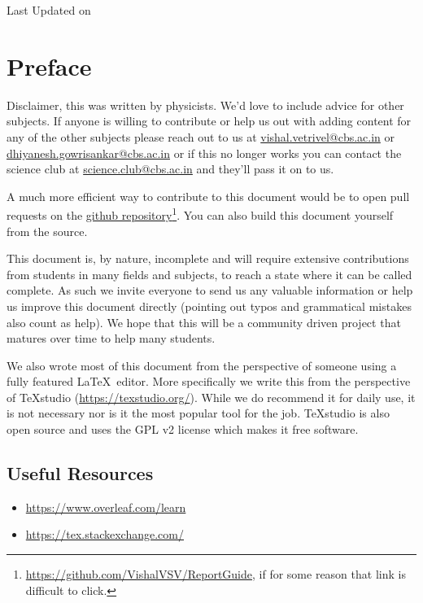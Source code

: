 \begin{titlepage}
	\makeatletter
	\begin{center}
		\vspace*{5cm}
		\@title
		\vfill
		{\small Last Updated on \@date}
	\end{center}
	\makeatother
\end{titlepage}


\chapter{Preface}
Disclaimer, this was written by physicists. We'd love to include advice for other subjects. If anyone is willing to contribute or help us out with adding content for any of the other subjects please reach out to us at \href{mailto:vishal.vetrivel@cbs.ac.in}{vishal.vetrivel@cbs.ac.in} or \href{mailto:dhiyanesh.gowrisankar@cbs.ac.in}{dhiyanesh.gowrisankar@cbs.ac.in} or if this no longer works you can contact the science club at \href{mailto:science.club@cbs.ac.in}{science.club@cbs.ac.in} and they'll pass it on to us.

A much more efficient way to contribute to this document would be to open pull requests on the \href{https://github.com/VishalVSV/ReportGuide}{github repository}\footnote{\url{https://github.com/VishalVSV/ReportGuide}, if for some reason that link is difficult to click.}. You can also build this document yourself from the source.

This document is, by nature, incomplete and will require extensive contributions from students in many fields and subjects, to reach a state where it can be called complete. As such we invite everyone to send us any valuable information or help us improve this document directly (pointing out typos and grammatical mistakes also count as help). We hope that this will be a community driven project that matures over time to help many students.

We also wrote most of this document from the perspective of someone using a fully featured \LaTeX\ editor. More specifically we write this from the perspective of TeXstudio (\url{https://texstudio.org/}). While we do recommend it for daily use, it is not necessary nor is it the most popular tool for the job. TeXstudio is also open source and uses the GPL v2 license which makes it free software.


\section*{Useful Resources}
\begin{itemize}
	\item \url{https://www.overleaf.com/learn}
	\item \url{https://tex.stackexchange.com/}
\end{itemize}
\tableofcontents
